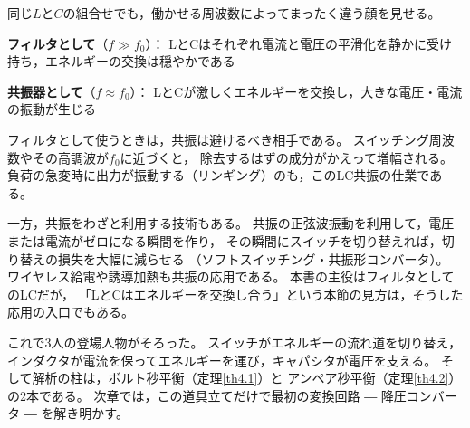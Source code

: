 同じ$L$と$C$の組合せでも，働かせる周波数によってまったく違う顔を見せる。

\begin{箇条書}
\item \textbf{フィルタとして}（$f \gg f_0$）：
LとCはそれぞれ電流と電圧の平滑化を静かに受け持ち，エネルギーの交換は穏やかである
\item \textbf{共振器として}（$f \approx f_0$）：
LとCが激しくエネルギーを交換し，大きな電圧・電流の振動が生じる
\end{箇条書}

フィルタとして使うときは，共振は避けるべき相手である。
スイッチング周波数やその高調波が$f_0$に近づくと，
除去するはずの成分がかえって増幅される。
負荷の急変時に出力が振動する（リンギング）のも，このLC共振の仕業である。

一方，共振をわざと利用する技術もある。
共振の正弦波振動を利用して，電圧または電流がゼロになる瞬間を作り，
その瞬間にスイッチを切り替えれば，切り替えの損失を大幅に減らせる
（ソフトスイッチング・共振形コンバータ）。
ワイヤレス給電や誘導加熱も共振の応用である。
本書の主役はフィルタとしてのLCだが，
「LとCはエネルギーを交換し合う」という本節の見方は，そうした応用の入口でもある。

これで3人の登場人物がそろった。
スイッチがエネルギーの流れ道を切り替え，
インダクタが電流を保ってエネルギーを運び，キャパシタが電圧を支える。
そして解析の柱は，ボルト秒平衡（定理\ref{th4.1}）と
アンペア秒平衡（定理\ref{th4.2}）の2本である。
次章では，この道具立てだけで最初の変換回路 ― 降圧コンバータ ― を解き明かす。

